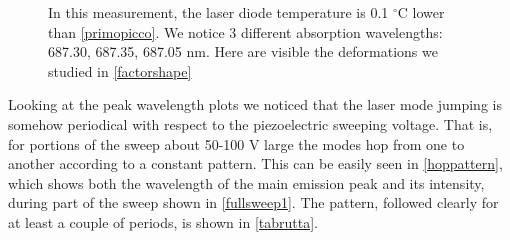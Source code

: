 \begin{figure}[!hptb]\centering
{} 
\caption{In this measurement, the laser diode temperature is 0.1 $^\circ$C lower than \cref{primopicco}. We notice 3 different absorption wavelengths: 687.30, 687.35, 687.05 nm. Here are visible the deformations we studied in \cref{factorshape}}\label{moltipicchi}
\end{figure} 

\medskip
Looking at the peak wavelength plots we noticed that the laser mode jumping is somehow periodical with respect to the piezoelectric sweeping voltage. That is, for portions of the sweep about 50-100 V large the modes hop from one to another according to a constant pattern.
This can be easily seen in \cref{hoppattern}, which shows both the wavelength of the main emission peak and its intensity, during part of the sweep shown in \cref{fullsweep1}. The pattern, followed clearly for at least a couple of periods, is shown in \cref{tabrutta}.

